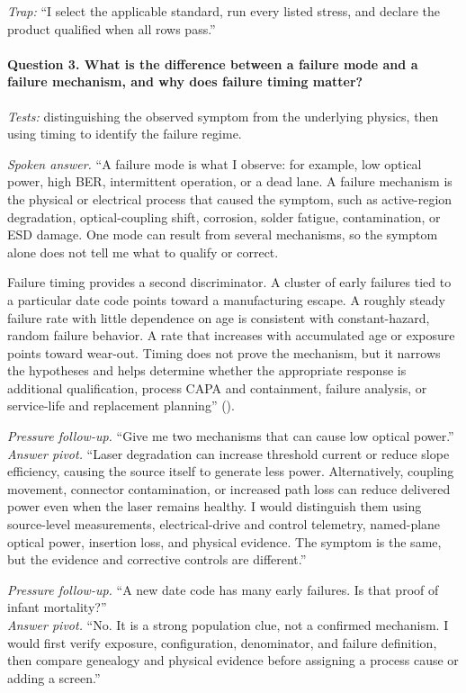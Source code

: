 \textit{Trap:} ``I select the applicable standard, run every listed stress, and
declare the product qualified when all rows pass.''

\paragraph{Question 3. What is the difference between a failure mode and a
failure mechanism, and why does failure timing matter?}
\textit{Tests:} distinguishing the observed symptom from the underlying physics,
then using timing to identify the failure regime.

\textit{Spoken answer.}
``A failure mode is what I observe: for example, low optical power, high BER,
intermittent operation, or a dead lane. A failure mechanism is the physical or
electrical process that caused the symptom, such as active-region degradation,
optical-coupling shift, corrosion, solder fatigue, contamination, or ESD damage.
One mode can result from several mechanisms, so the symptom alone does not tell
me what to qualify or correct.

Failure timing provides a second discriminator. A cluster of early failures
tied to a particular date code points toward a manufacturing escape. A roughly
steady failure rate with little dependence on age is consistent with
constant-hazard, random failure behavior. A rate that increases with accumulated
age or exposure points toward wear-out. Timing does not prove the mechanism, but
it narrows the hypotheses and helps determine whether the appropriate response
is additional qualification, process CAPA and containment, failure analysis, or
service-life and replacement planning''
().

\textit{Pressure follow-up.} ``Give me two mechanisms that can cause low optical
power.''\\
\textit{Answer pivot.} ``Laser degradation can increase threshold current or
reduce slope efficiency, causing the source itself to generate less power.
Alternatively, coupling movement, connector contamination, or increased path
loss can reduce delivered power even when the laser remains healthy. I would
distinguish them using source-level measurements, electrical-drive and control
telemetry, named-plane optical power, insertion loss, and physical evidence. The
symptom is the same, but the evidence and corrective controls are different.''

\textit{Pressure follow-up.} ``A new date code has many early failures. Is that
proof of infant mortality?''\\
\textit{Answer pivot.} ``No. It is a strong population clue, not a confirmed
mechanism. I would first verify exposure, configuration, denominator, and
failure definition, then compare genealogy and physical evidence before
assigning a process cause or adding a screen.''

